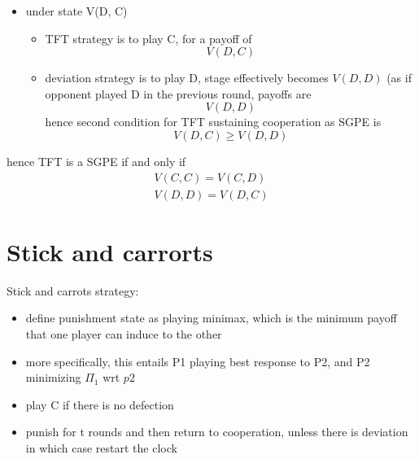 \documentclass[a4paper, 10pt]{article}
\begin{document}
\begin{itemize}
\begin{itemize}
      \end{itemize}	
   \item under state V(D, C)
      \begin{itemize}
         \item TFT strategy is to play C, for a payoff of 
            \[
               V(D, C)
            \]
            
         \item deviation strategy is to play D, stage effectively becomes $V(D, D)$  (as if opponent played D in the previous round, payoffs are
            \[
               V(D, D)
            \]
         hence second condition for TFT sustaining cooperation as SGPE is 
         \begin{equation}
            V(D, C) \ge V(D, D)
         \end{equation}	
            
      \end{itemize}	
\end{itemize}	

hence TFT is a SGPE if and only if 
\begin{align*}
   V(C, C) = V(C, D) \\
   V(D, D) = V(D, C)
\end{align*}	
\section{Stick and carrorts}
\begin{framed}
   Stick and carrots strategy: 
   \begin{itemize}
      \item define punishment state as playing minimax, which is the minimum payoff that one player can induce to the other
      \item more specifically, this entails P1 playing best response to P2, and P2 minimizing $\Pi_1$ wrt $p2$ 
      \item play C if there is no defection
      \item punish for t rounds and then return to cooperation, unless there is deviation in which case restart the clock
   \end{itemize}	
\end{framed}	
\end{document}
